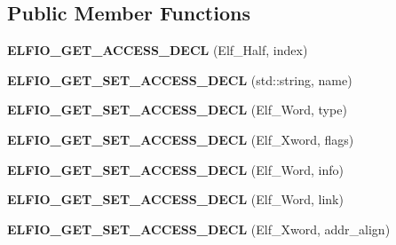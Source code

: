 \subsection*{Public Member Functions}
\begin{DoxyCompactItemize}
\item 
{\bfseries E\+L\+F\+I\+O\+\_\+\+G\+E\+T\+\_\+\+A\+C\+C\+E\+S\+S\+\_\+\+D\+E\+CL} (Elf\+\_\+\+Half, index)\hypertarget{class_e_l_f_i_o_1_1section_a533f598247c1bb8fffc17121346bae92}{}\label{class_e_l_f_i_o_1_1section_a533f598247c1bb8fffc17121346bae92}

\item 
{\bfseries E\+L\+F\+I\+O\+\_\+\+G\+E\+T\+\_\+\+S\+E\+T\+\_\+\+A\+C\+C\+E\+S\+S\+\_\+\+D\+E\+CL} (std\+::string, name)\hypertarget{class_e_l_f_i_o_1_1section_a1cb62f46f56630143fb3659fe44b32b7}{}\label{class_e_l_f_i_o_1_1section_a1cb62f46f56630143fb3659fe44b32b7}

\item 
{\bfseries E\+L\+F\+I\+O\+\_\+\+G\+E\+T\+\_\+\+S\+E\+T\+\_\+\+A\+C\+C\+E\+S\+S\+\_\+\+D\+E\+CL} (Elf\+\_\+\+Word, type)\hypertarget{class_e_l_f_i_o_1_1section_ae8c29fbbd15e0771a61bbc1746964b87}{}\label{class_e_l_f_i_o_1_1section_ae8c29fbbd15e0771a61bbc1746964b87}

\item 
{\bfseries E\+L\+F\+I\+O\+\_\+\+G\+E\+T\+\_\+\+S\+E\+T\+\_\+\+A\+C\+C\+E\+S\+S\+\_\+\+D\+E\+CL} (Elf\+\_\+\+Xword, flags)\hypertarget{class_e_l_f_i_o_1_1section_a4756eae05c24fc58fd6946d4b56c2afb}{}\label{class_e_l_f_i_o_1_1section_a4756eae05c24fc58fd6946d4b56c2afb}

\item 
{\bfseries E\+L\+F\+I\+O\+\_\+\+G\+E\+T\+\_\+\+S\+E\+T\+\_\+\+A\+C\+C\+E\+S\+S\+\_\+\+D\+E\+CL} (Elf\+\_\+\+Word, info)\hypertarget{class_e_l_f_i_o_1_1section_a837f7d5498b8c0113ddc270b196d7fbb}{}\label{class_e_l_f_i_o_1_1section_a837f7d5498b8c0113ddc270b196d7fbb}

\item 
{\bfseries E\+L\+F\+I\+O\+\_\+\+G\+E\+T\+\_\+\+S\+E\+T\+\_\+\+A\+C\+C\+E\+S\+S\+\_\+\+D\+E\+CL} (Elf\+\_\+\+Word, link)\hypertarget{class_e_l_f_i_o_1_1section_a522dc4931d54b2f59b7320954569ee8b}{}\label{class_e_l_f_i_o_1_1section_a522dc4931d54b2f59b7320954569ee8b}

\item 
{\bfseries E\+L\+F\+I\+O\+\_\+\+G\+E\+T\+\_\+\+S\+E\+T\+\_\+\+A\+C\+C\+E\+S\+S\+\_\+\+D\+E\+CL} (Elf\+\_\+\+Xword, addr\+\_\+align)\hypertarget{class_e_l_f_i_o_1_1section_adf2e4c983dcfcc07487a54bd686cc9fe}{}\label{class_e_l_f_i_o_1_1section_adf2e4c983dcfcc07487a54bd686cc9fe}


\end{DoxyCompactItemize}
